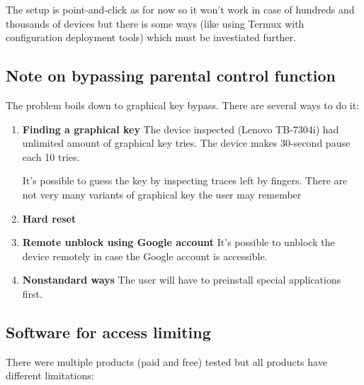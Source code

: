 The setup is point-and-click as for now so it won't work in case of
hundreds and thousands of devices but there is some ways (like using
Termux with configuration deployment tools) which must be investiated
further.


\subsection{Note on bypassing parental control function}

The problem boils down to graphical key bypass. There are
several ways to do it:

\begin{enumerate}
\item \textbf{Finding a graphical key}
The device inspected (Lenovo TB-7304i) had unlimited amount of
graphical key tries. The device makes 30-second pause each 10 tries.

It's possible to guess the key by inspecting traces left by fingers.
There are not very many variants of graphical key the user may remember
\item \textbf{Hard reset}
\item \textbf{Remote unblock using Google account}
It's possible to unblock the device remotely in case the Google account
is accessible.
\item \textbf{Nonstandard ways}
The user will have to preinstall special applications first.
\end{enumerate}


\subsection{Software for access limiting}

There were multiple products (paid and free) tested but all products
have different limitations:

